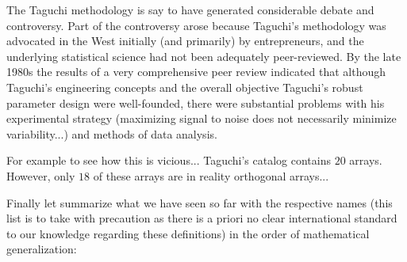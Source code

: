 	The Taguchi methodology is say to have generated considerable debate and controversy. Part of the controversy arose because Taguchi's methodology was advocated in the West initially (and primarily) by entrepreneurs, and the underlying statistical science had not been adequately peer-reviewed. By the late 1980s the results of a very comprehensive peer review indicated that although Taguchi's engineering concepts and the overall objective Taguchi's robust parameter design were well-founded\cite{co2008confirmation}, there were substantial problems with his experimental strategy (maximizing signal to noise does not necessarily minimize variability...) and methods of data analysis\cite{kacker1991taguchi}.
	\begin{tcolorbox}[title=Remark,colframe=black,arc=10pt]
	For example to see how this is vicious... Taguchi's catalog contains $20$ arrays. However, only $18$ of these arrays are in reality orthogonal arrays...
	\end{tcolorbox}
	Finally let summarize what we have seen so far with the respective names (this list is to take with precaution as there is a priori no clear international standard to our knowledge regarding these definitions) in the order of mathematical generalization:
